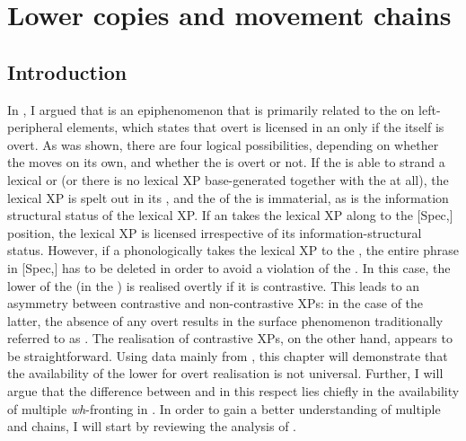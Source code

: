 \chapter{Lower copies and movement chains} \label{ch:5}
\section{Introduction} \label{sec:5introduction}
In , I argued that  is an epiphenomenon that is primarily related to the  on left-peripheral elements, which states that overt  is licensed in an  only if the  itself is overt. As was shown, there are four logical possibilities, depending on whether the  moves on its own, and whether the  is overt or not. If the  is able to strand a lexical  or  (or there is no lexical XP base-generated together with the  at all), the lexical XP is spelt out in its , and the  of the  is immaterial, as is the information structural status of the lexical XP. If an  takes the lexical XP along to the [Spec,] position, the lexical XP is licensed irrespective of its information-structural status. However, if a phonologically  takes the lexical XP to the  , the entire phrase in [Spec,] has to be deleted in order to avoid a violation of the . In this case, the lower  of the  (in the ) is realised overtly if it is contrastive. This leads to an asymmetry between contrastive and non-contrastive XPs: in the case of the latter, the absence of any overt  results in the surface phenomenon traditionally referred to as . The realisation of contrastive XPs, on the other hand, appears to be straightforward. Using data mainly from , this chapter will demonstrate that the availability of the lower  for overt realisation is not universal. Further, I will argue that the difference between  and  in this respect lies chiefly in the availability of multiple \textit{wh}-fronting in . In order to gain a better understanding of multiple  and  chains, I will start by reviewing the analysis of \citet{boskovic2002}.

